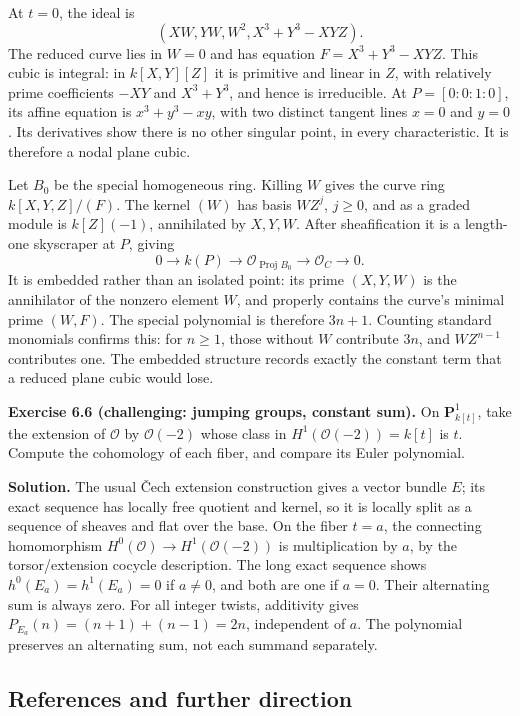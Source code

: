 \documentclass[11pt]{article}
\begin{document}
At \(t=0\), the ideal is \[
(XW,YW,W^2,X^3+Y^3-XYZ).
\] The reduced curve lies in \(W=0\) and has equation \(F=X^3+Y^3-XYZ\).
This cubic is integral: in \(k[X,Y][Z]\) it is primitive and linear in
\(Z\), with relatively prime coefficients \(-XY\) and \(X^3+Y^3\), and
hence is irreducible. At \(P=[0:0:1:0]\), its affine equation is
\(x^3+y^3-xy\), with two distinct tangent lines \(x=0\) and \(y=0\). Its
derivatives show there is no other singular point, in every
characteristic. It is therefore a nodal plane cubic.

Let \(B_0\) be the special homogeneous ring. Killing \(W\) gives the
curve ring \(k[X,Y,Z]/(F)\). The kernel \((W)\) has basis \(WZ^j\),
\(j\geq0\), and as a graded module is \(k[Z](-1)\), annihilated by
\(X,Y,W\). After sheafification it is a length-one skyscraper at \(P\),
giving \[
0\to k(P)\to\mathcal O_{\operatorname{Proj}B_0}\to\mathcal O_C\to0.
\] It is embedded rather than an isolated point: its prime \((X,Y,W)\)
is the annihilator of the nonzero element \(W\), and properly contains
the curve's minimal prime \((W,F)\). The special polynomial is therefore
\(3n+1\). Counting standard monomials confirms this: for \(n\geq1\),
those without \(W\) contribute \(3n\), and \(WZ^{n-1}\) contributes one.
The embedded structure records exactly the constant term that a reduced
plane cubic would lose.

\textbf{Exercise 6.6 (challenging: jumping groups, constant sum).} On
\(\mathbf P^1_{k[t]}\), take the extension of \(\mathcal O\) by
\(\mathcal O(-2)\) whose class in \(H^1(\mathcal O(-2))=k[t]\) is \(t\).
Compute the cohomology of each fiber, and compare its Euler polynomial.

\textbf{Solution.} The usual Čech extension construction gives a vector
bundle \(E\); its exact sequence has locally free quotient and kernel,
so it is locally split as a sequence of sheaves and flat over the base.
On the fiber \(t=a\), the connecting homomorphism
\(H^0(\mathcal O)\to H^1(\mathcal O(-2))\) is multiplication by \(a\),
by the torsor/extension cocycle description. The long exact sequence
shows \(h^0(E_a)=h^1(E_a)=0\) if \(a\ne0\), and both are one if \(a=0\).
Their alternating sum is always zero. For all integer twists, additivity
gives \(P_{E_a}(n)=(n+1)+(n-1)=2n\), independent of \(a\). The
polynomial preserves an alternating sum, not each summand separately.

\subsection{References and further
direction}\label{references-and-further-direction}
\end{document}
